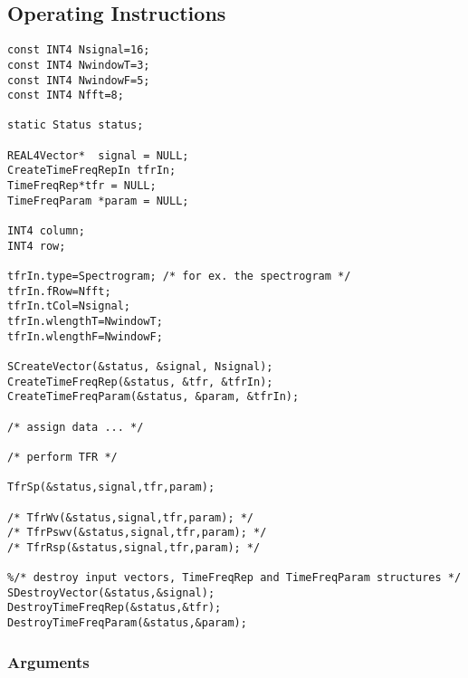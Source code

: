 \documentclass{article}
\begin{document}
\subsection{Operating Instructions}


\begin{verbatim}
const INT4 Nsignal=16;
const INT4 NwindowT=3;
const INT4 NwindowF=5;
const INT4 Nfft=8;

static Status status;

REAL4Vector*  signal = NULL;
CreateTimeFreqRepIn tfrIn;
TimeFreqRep*tfr = NULL; 
TimeFreqParam *param = NULL;

INT4 column;
INT4 row;

tfrIn.type=Spectrogram; /* for ex. the spectrogram */
tfrIn.fRow=Nfft;              
tfrIn.tCol=Nsignal; 
tfrIn.wlengthT=NwindowT;
tfrIn.wlengthF=NwindowF;

SCreateVector(&status, &signal, Nsignal);
CreateTimeFreqRep(&status, &tfr, &tfrIn);
CreateTimeFreqParam(&status, &param, &tfrIn);

/* assign data ... */

/* perform TFR */

TfrSp(&status,signal,tfr,param);

/* TfrWv(&status,signal,tfr,param); */
/* TfrPswv(&status,signal,tfr,param); */
/* TfrRsp(&status,signal,tfr,param); */

%/* destroy input vectors, TimeFreqRep and TimeFreqParam structures */
SDestroyVector(&status,&signal);
DestroyTimeFreqRep(&status,&tfr);
DestroyTimeFreqParam(&status,&param);
\end{verbatim}

\subsubsection{Arguments}

\end{document}
